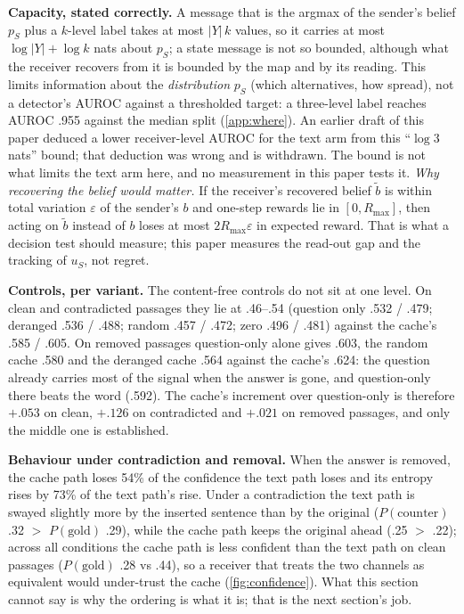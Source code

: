 \documentclass{article}
\begin{document}
\begin{tcolorbox}[breakable, enhanced, colback=white, colframe=black, boxrule=0.5pt, arc=0pt, left=3pt, right=3pt, top=2pt, bottom=2pt, before skip=4pt, after skip=6pt]
\small
\textbf{Capacity, stated correctly.}
A message that is the argmax of the sender's belief $p_S$ plus a $k$-level label takes at most $|Y|\,k$ values, so it carries at most $\log |Y| + \log k$ nats about $p_S$; a state message is not so bounded, although what the receiver recovers from it is bounded by the map and by its reading. This limits information about the \emph{distribution} $p_S$ (which alternatives, how spread), not a detector's AUROC against a thresholded target: a three-level label reaches AUROC .955 against the median split (\cref{app:where}). An earlier draft of this paper deduced a lower receiver-level AUROC for the text arm from this ``$\log 3$ nats'' bound; that deduction was wrong and is withdrawn. The bound is not what limits the text arm here, and no measurement in this paper tests it.
\emph{Why recovering the belief would matter.} If the receiver's recovered belief $\tilde b$ is within total variation $\varepsilon$ of the sender's $b$ and one-step rewards lie in $[0, R_{\max}]$, then acting on $\tilde b$ instead of $b$ loses at most $2 R_{\max} \varepsilon$ in expected reward. That is what a decision test should measure; this paper measures the read-out gap and the tracking of $u_S$, not regret.
\end{tcolorbox}


\textbf{Controls, per variant.} The content-free controls do not sit at one level. On clean and contradicted passages they lie at .46--.54 (question only .532 / .479; deranged .536 / .488; random .457 / .472; zero .496 / .481) against the cache's .585 / .605. On removed passages question-only alone gives .603, the random cache .580 and the deranged cache .564 against the cache's .624: the question already carries most of the signal when the answer is gone, and question-only there beats the word (.592). The cache's increment over question-only is therefore $+.053$ on clean, $+.126$ on contradicted and $+.021$ on removed passages, and only the middle one is established.

\textbf{Behaviour under contradiction and removal.} When the answer is removed, the cache path loses 54\% of the confidence the text path loses and its entropy rises by 73\% of the text path's rise. Under a contradiction the text path is swayed slightly more by the inserted sentence than by the original ($P(\text{counter})$ .32 $>$ $P(\text{gold})$ .29), while the cache path keeps the original ahead (.25 $>$ .22); across all conditions the cache path is less confident than the text path on clean passages ($P(\text{gold})$ .28 vs .44), so a receiver that treats the two channels as equivalent would under-trust the cache (\cref{fig:confidence}). What this section cannot say is why the ordering is what it is; that is the next section's job.
\end{document}
